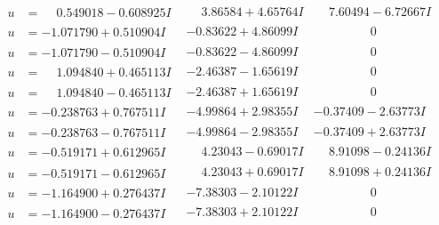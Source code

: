 \documentclass[1p]{elsarticle_modified}
\theoremstyle{definition}
\begin{document}
$$\begin{array}{c|c|c}
\begin{aligned}
u &= \phantom{-}0.549018 - 0.608925 I\end{aligned}
 & \phantom{-}3.86584 + 4.65764 I & \phantom{-}7.60494 - 6.72667 I \\ \hline\begin{aligned}
u &= -1.071790 + 0.510904 I\end{aligned}
 & -0.83622 + 4.86099 I & \phantom{-0.000000 } 0 \\ \hline\begin{aligned}
u &= -1.071790 - 0.510904 I\end{aligned}
 & -0.83622 - 4.86099 I & \phantom{-0.000000 } 0 \\ \hline\begin{aligned}
u &= \phantom{-}1.094840 + 0.465113 I\end{aligned}
 & -2.46387 - 1.65619 I & \phantom{-0.000000 } 0 \\ \hline\begin{aligned}
u &= \phantom{-}1.094840 - 0.465113 I\end{aligned}
 & -2.46387 + 1.65619 I & \phantom{-0.000000 } 0 \\ \hline\begin{aligned}
u &= -0.238763 + 0.767511 I\end{aligned}
 & -4.99864 + 2.98355 I & -0.37409 - 2.63773 I \\ \hline\begin{aligned}
u &= -0.238763 - 0.767511 I\end{aligned}
 & -4.99864 - 2.98355 I & -0.37409 + 2.63773 I \\ \hline\begin{aligned}
u &= -0.519171 + 0.612965 I\end{aligned}
 & \phantom{-}4.23043 - 0.69017 I & \phantom{-}8.91098 - 0.24136 I \\ \hline\begin{aligned}
u &= -0.519171 - 0.612965 I\end{aligned}
 & \phantom{-}4.23043 + 0.69017 I & \phantom{-}8.91098 + 0.24136 I \\ \hline\begin{aligned}
u &= -1.164900 + 0.276437 I\end{aligned}
 & -7.38303 - 2.10122 I & \phantom{-0.000000 } 0 \\ \hline\begin{aligned}
u &= -1.164900 - 0.276437 I\end{aligned}
 & -7.38303 + 2.10122 I & \phantom{-0.000000 } 0 \\ \hline\begin{aligned}

\end{aligned}
\end{array}$$
\end{document}
